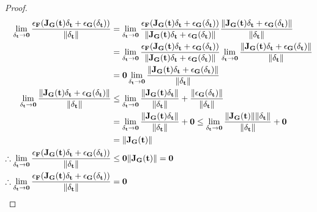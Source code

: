 \begin{lemma}
\begin{proof}
\begin{align*}
            \lim_{\delta_{\mathbf{t}}\rightarrow\mathbf{0}}\frac{\epsilon_{\mathbf{F}}(\mathbf{J}_{\mathbf{G}}(\mathbf{t})\delta_{\mathbf{t}}+\epsilon_{\mathbf{G}}(\delta_{\mathbf{t}}))}{\lVert\delta_{\mathbf{t}}\rVert}&=\lim_{\delta_{\mathbf{t}}\rightarrow\mathbf{0}}\frac{\epsilon_{\mathbf{F}}(\mathbf{J}_{\mathbf{G}}(\mathbf{t})\delta_{\mathbf{t}}+\epsilon_{\mathbf{G}}(\delta_{\mathbf{t}}))}{\lVert\mathbf{J}_{\mathbf{G}}(\mathbf{t})\delta_{\mathbf{t}}+\epsilon_{\mathbf{G}}(\delta_{\mathbf{t}})\rVert}\frac{\lVert\mathbf{J}_{\mathbf{G}}(\mathbf{t})\delta_{\mathbf{t}}+\epsilon_{\mathbf{G}}(\delta_{\mathbf{t}})\rVert}{\lVert\delta_{\mathbf{t}}\rVert}\\
            &=\lim_{\delta_{\mathbf{t}}\rightarrow\mathbf{0}}\frac{\epsilon_{\mathbf{F}}(\mathbf{J}_{\mathbf{G}}(\mathbf{t})\delta_{\mathbf{t}}+\epsilon_{\mathbf{G}}(\delta_{\mathbf{t}}))}{\lVert\mathbf{J}_{\mathbf{G}}(\mathbf{t})\delta_{\mathbf{t}}+\epsilon_{\mathbf{G}}(\delta_{\mathbf{t}})\rVert}\lim_{\delta_{\mathbf{t}}\rightarrow\mathbf{0}}\frac{\lVert\mathbf{J}_{\mathbf{G}}(\mathbf{t})\delta_{\mathbf{t}}+\epsilon_{\mathbf{G}}(\delta_{\mathbf{t}})\rVert}{\lVert\delta_{\mathbf{t}}\rVert}\\
            &=\mathbf{0}\lim_{\delta_{\mathbf{t}}\rightarrow\mathbf{0}}\frac{\lVert\mathbf{J}_{\mathbf{G}}(\mathbf{t})\delta_{\mathbf{t}}+\epsilon_{\mathbf{G}}(\delta_{\mathbf{t}})\rVert}{\lVert\delta_{\mathbf{t}}\rVert}\\
            \lim_{\delta_{\mathbf{t}}\rightarrow\mathbf{0}}\frac{\lVert\mathbf{J}_{\mathbf{G}}(\mathbf{t})\delta_{\mathbf{t}}+\epsilon_{\mathbf{G}}(\delta_{\mathbf{t}})\rVert}{\lVert\delta_{\mathbf{t}}\rVert}&\leq\lim_{\delta_{\mathbf{t}}\rightarrow\mathbf{0}}\frac{\lVert\mathbf{J}_{\mathbf{G}}(\mathbf{t})\delta_{\mathbf{t}}\rVert}{\lVert\delta_{\mathbf{t}}\rVert}+\frac{\lVert\epsilon_{\mathbf{G}}(\delta_{\mathbf{t}})\rVert}{\lVert\delta_{\mathbf{t}}\rVert}\\
            &=\lim_{\delta_{\mathbf{t}}\rightarrow\mathbf{0}}\frac{\lVert\mathbf{J}_{\mathbf{G}}(\mathbf{t})\delta_{\mathbf{t}}\rVert}{\lVert\delta_{\mathbf{t}}\rVert}+\mathbf{0}\leq\lim_{\delta_{\mathbf{t}}\rightarrow\mathbf{0}}\frac{\lVert\mathbf{J}_{\mathbf{G}}(\mathbf{t})\rVert\lVert\delta_{\mathbf{t}}\rVert}{\lVert\delta_{\mathbf{t}}\rVert}+\mathbf{0}\\
            &=\lVert\mathbf{J}_{\mathbf{G}}(\mathbf{t})\rVert\\
            \therefore\lim_{\delta_{\mathbf{t}}\rightarrow\mathbf{0}}\frac{\epsilon_{\mathbf{F}}(\mathbf{J}_{\mathbf{G}}(\mathbf{t})\delta_{\mathbf{t}}+\epsilon_{\mathbf{G}}(\delta_{\mathbf{t}}))}{\lVert\delta_{\mathbf{t}}\rVert}&\leq\mathbf{0}\lVert\mathbf{J}_{\mathbf{G}}(\mathbf{t})\rVert=\mathbf{0}\\
            \therefore\lim_{\delta_{\mathbf{t}}\rightarrow\mathbf{0}}\frac{\epsilon_{\mathbf{F}}(\mathbf{J}_{\mathbf{G}}(\mathbf{t})\delta_{\mathbf{t}}+\epsilon_{\mathbf{G}}(\delta_{\mathbf{t}}))}{\lVert\delta_{\mathbf{t}}\rVert}&=\mathbf{0}
        \end{align*}

\end{proof}
\end{lemma}
